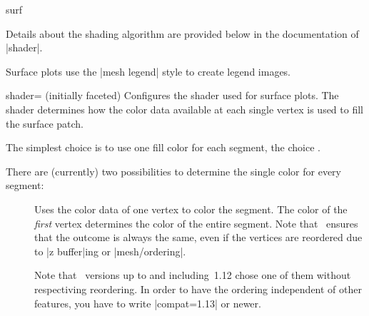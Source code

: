 {\begin{plottype}[/pgfplots]{surf}
\pgfplotsexpensiveexample
\begin{codeexample}[]
\end{codeexample}

	Details about the shading algorithm are provided below in the documentation of |shader|.

	Surface plots use the |mesh legend| style to create legend images.
\end{plottype}

\begin{pgfplotskey}{shader= (initially faceted)}
	Configures the shader used for surface plots. The shader determines how the color data available at each single vertex is used to fill the surface patch.

	The simplest choice is to use one fill color for each segment, the choice .

\pgfplotsexpensiveexample
\begin{codeexample}[]
\end{codeexample}

	\noindent There are (currently) two possibilities to determine the single color for every segment:
	\begin{description}
		\item[] Uses the color data of one vertex to color the segment. The color of the \emph{first} vertex determines the color of the entire segment. Note that \PGFPlots\ ensures that the outcome is always the same, even if the vertices are reordered due to |z buffer|ing or |mesh/ordering|. 

		Note that \PGFPlots\ versions up to and including~1.12 chose one of them without respectiving reordering. In order to have the ordering independent of other features, you have to write |compat=1.13| or newer.
		


\end{description}
\end{pgfplotskey}}
